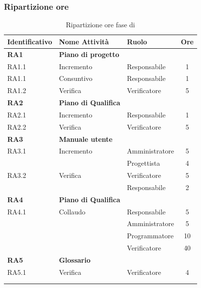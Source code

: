 \subsubsection{Ripartizione ore}
\bgroup
\begin{longtable}{|l|l|l|c|}
	\endfirsthead
	\hline
	\textbf{Identificativo} &
	\textbf{Nome Attività} &
	\textbf{Ruolo} &
	\textbf{Ore}\\
	\endhead
	\hline
	\textbf{RA1} & \textbf{Piano di progetto} &  &  \\
	\hline
	{RA1.1} & {Incremento} & Responsabile  & 1\\
	\hline
	{RA1.1} & {Consuntivo} & Responsabile  & 1\\
	\hline
	{RA1.2} & {Verifica} & Verificatore & 5 \\
	\hline
	\textbf{RA2} & \textbf{Piano di Qualifica}  & & \\
	\hline
	{RA2.1} & {Incremento} & Responsabile &  1\\
	\hline
	{RA2.2} & {Verifica} & Verificatore & 5 \\
	\hline
	\textbf{RA3} & \textbf{Manuale utente} & &  \\
	\hline
	{RA3.1} & {Incremento} & Amministratore  &  5\\
	& & Progettista & 4 \\
	\hline
	{RA3.2} & {Verifica} & Verificatore  &  5\\
	& & Responsabile & 2 \\
	\hline
	\textbf{RA4} & \textbf{Piano di Qualifica}  & & \\
	\hline
	{RA4.1} & {Collaudo} & Responsabile &  5\\
	& & Amministratore & 5 \\
	& & Programmatore & 10 \\
	& & Verificatore & 40 \\
	\hline
	\textbf{RA5} & \textbf{Glossario} & &  \\
	\hline
	{RA5.1} & {Verifica} & Verificatore &  4 \\
	\hline
	\\
	\caption{Ripartizione ore fase di \VV{}}
\end{longtable}
\egroup

